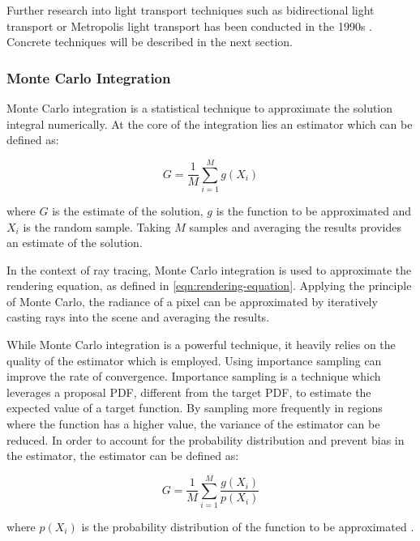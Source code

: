 Further research into light transport techniques such as bidirectional light transport or Metropolis light transport has been conducted in the 1990s \cite{veachMonteCarloLightTransport}. Concrete techniques will be described in the next section.

\subsubsection{Monte Carlo Integration}

Monte Carlo integration is a statistical technique to approximate the solution integral numerically. At the core of the integration lies an estimator which can be defined as:

\begin{equation}
  G = \frac{1}{M}\sum_{i=1}^M g(X_i)
  \label{eq:monteCarlo}
\end{equation}

where $G$ is the estimate of the solution, $g$ is the function to be approximated and $X_i$ is the random sample. Taking $M$ samples and averaging the results provides an estimate of the solution. \cite{kalos2009monte}

In the context of ray tracing, Monte Carlo integration is used to approximate the rendering equation, as defined in \autoref{eqn:rendering-equation}. Applying the principle of Monte Carlo, the radiance of a pixel can be approximated by iteratively casting rays into the scene and averaging the results. 

While Monte Carlo integration is a powerful technique, it heavily relies on the quality of the estimator which is employed. Using importance sampling can improve the rate of convergence. Importance sampling is a technique which leverages a proposal \gls{PDF}, different from the target \gls{PDF}, to estimate the expected value of a target function. By sampling more frequently in regions where the function has a higher value, the variance of the estimator can be reduced. In order to account for the probability distribution and prevent bias in the estimator, the estimator can be defined as:

\begin{equation}
  G = \frac{1}{M}\sum_{i=1}^M \frac{g(X_i)}{p(X_i)}
  \label{eq:importanceSampling}
\end{equation}

where $p(X_i)$ is the probability distribution of the function to be approximated \cite{Pharr_Physically_Based_Rendering_2023}.

